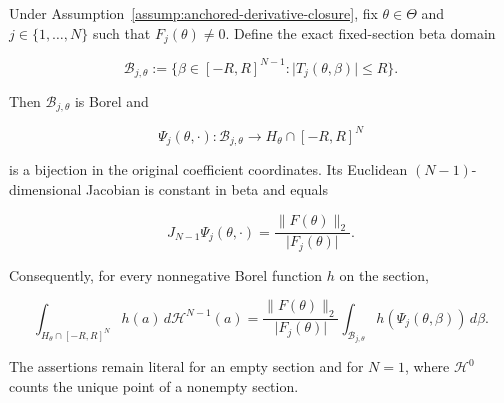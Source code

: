 \begin{lemma}
\label{lem:step-004-s2-section-parametrization}

Under Assumption~\ref{assump:anchored-derivative-closure}, fix
\(\theta\in\Theta\) and \(j\in\{1,\ldots,N\}\) such that \(F_j(\theta)\neq0\). Define the exact
fixed-section beta domain

\begin{equation}
\label{eq:appendix-display-107}
\mathcal B_{j,\theta}
:=\{\beta\in[-R,R]^{N-1}:
\lvert T_j(\theta,\beta)\rvert\leq R\}.
\end{equation}

Then \(\mathcal B_{j,\theta}\) is Borel and

\begin{equation}
\label{eq:appendix-display-108}
\Psi_j(\theta,\cdot):\mathcal B_{j,\theta}
\longrightarrow H_\theta\cap[-R,R]^N
\end{equation}

is a bijection in the original coefficient coordinates. Its Euclidean
\((N-1)\)-dimensional Jacobian is constant in beta and equals

\begin{equation}
\label{eq:appendix-display-109}
J_{N-1}\Psi_j(\theta,\cdot)
=\frac{\lVert F(\theta)\rVert_2}{\lvert F_j(\theta)\rvert}.
\end{equation}

Consequently, for every nonnegative Borel function \(h\) on the section,

\begin{equation}
\label{eq:appendix-display-110}
\int_{H_\theta\cap[-R,R]^N}h(a)\,d\mathcal H^{N-1}(a)
=
\frac{\lVert F(\theta)\rVert_2}{\lvert F_j(\theta)\rvert}
\int_{\mathcal B_{j,\theta}}
h(\Psi_j(\theta,\beta))\,d\beta.
\end{equation}

The assertions remain literal for an empty section and for \(N=1\), where \(\mathcal H^0\) counts the
unique point of a nonempty section.


\end{lemma}

